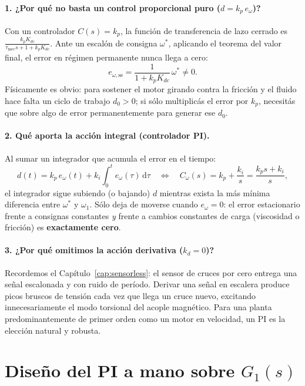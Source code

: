 \documentclass[11pt,a4paper,oneside]{book}
\newcommand{\dd}{\mathrm{d}}
\begin{document}
\paragraph{1. ¿Por qué no basta un control proporcional puro ($d = k_p\,e_\omega$)?}
Con un controlador $C(s) = k_p$, la función de transferencia de lazo cerrado es
$\frac{k_p K_{dc}}{\tau_{\text{mec}}s + 1 + k_p K_{dc}}$. Ante un escalón de
consigna $\omega^\ast$, aplicando el teorema del valor final, el error en
régimen permanente nunca llega a cero:
\[
  e_{\omega,\text{ss}} = \frac{1}{1 + k_p K_{dc}}\,\omega^\ast \neq 0.
\]
Físicamente es obvio: para sostener el motor girando contra la fricción y el
fluido hace falta un ciclo de trabajo $d_0 > 0$; si sólo multiplicás el error por
$k_p$, necesitás que sobre algo de error permanentemente para generar ese $d_0$.

\paragraph{2. Qué aporta la acción integral (controlador PI).}
Al sumar un integrador que acumula el error en el tiempo:
\begin{equation}
  d(t) = k_p\,e_\omega(t) + k_i\int_0^t e_\omega(\tau)\,\dd\tau
  \quad\Longleftrightarrow\quad
  C_\omega(s) = k_p + \frac{k_i}{s} = \frac{k_p s + k_i}{s},
  \label{eq:pi_continuo}
\end{equation}
el integrador sigue subiendo (o bajando) $d$ mientras exista la más mínima
diferencia entre $\omega^\ast$ y $\omega_1$. Sólo deja de moverse cuando
$e_\omega = 0$: el error estacionario frente a consignas constantes \emph{y}
frente a cambios constantes de carga (viscosidad o fricción) es
\textbf{exactamente cero}.

\paragraph{3. ¿Por qué omitimos la acción derivativa ($k_d = 0$)?}
Recordemos el Capítulo~\ref{cap:sensorless}: el sensor de cruces por cero
entrega una señal escalonada y con ruido de período. Derivar una señal en
escalera produce picos bruscos de tensión cada vez que llega un cruce nuevo,
excitando innecesariamente el modo torsional del acople magnético. Para una
planta predominantemente de primer orden como un motor en velocidad, un PI es la
elección natural y robusta.

\section{Diseño del PI a mano sobre \texorpdfstring{$G_1(s)$}{G1(s)}}
\end{document}
